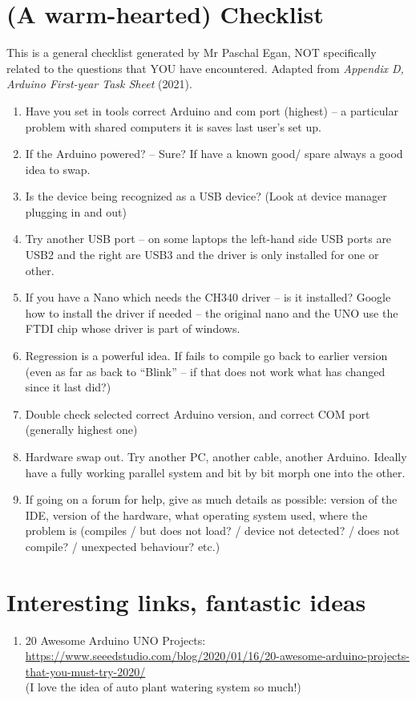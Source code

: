 \documentclass{article}
\begin{document}
\begin{appendices}
\newpage
\section{(A warm-hearted) Checklist}
This is a general checklist generated by Mr Paschal Egan, NOT specifically related to the questions that YOU have encountered. Adapted from \textit{Appendix D, Arduino First-year Task Sheet} (2021).  
\begin{enumerate}
    \item Have you set in tools correct Arduino and com port (highest) – a particular problem with shared computers it is saves last user’s set up.
    \item If the Arduino powered? – Sure? If have a known good/ spare always a good idea to swap.
    \item Is the device being recognized as a USB device? (Look at device manager plugging in and out)
    \item Try another USB port – on some laptops the left-hand side USB ports are USB2 and the right are USB3 and the driver is only installed for one or other.
    \item If you have a Nano which needs the CH340 driver – is it installed? Google how to install the driver if needed – the original nano and the UNO use the FTDI chip whose driver is part of windows.
    \item Regression is a powerful idea. If fails to compile go back to earlier version (even as far as back to “Blink” – if that does not work what has changed since it last did?)
    \item Double check selected correct Arduino version, and correct COM port (generally highest one)
    \item Hardware swap out. Try another PC, another cable, another Arduino. Ideally have a fully working parallel system and bit by bit morph one into the other.
    \item If going on a forum for help, give as much details as possible: version of the IDE, version of the hardware, what operating system used, where the problem is (compiles / but does not load? / device not detected? / does not compile? / unexpected behaviour? etc.)
\end{enumerate}

\vspace{2cm}

\section{Interesting links, fantastic ideas}
\begin{enumerate}
    \item 20 Awesome Arduino UNO Projects: \\
    \href{https://www.seeedstudio.com/blog/2020/01/16/20-awesome-arduino-projects-that-you-must-try-2020/}{https://www.seeedstudio.com/blog/2020/01/16/20-awesome-arduino-projects-that-you-must-try-2020/}\\ {\color{gray}(I love the idea of auto plant watering system so much!)}
    

\end{enumerate}
\end{appendices}
\end{document}

